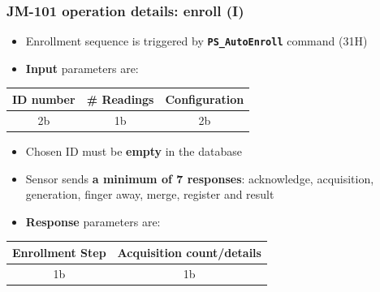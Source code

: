 \documentclass[handout]{beamer}
\begin{document}
\begin{frame}
  \frametitle{JM-101 operation details: enroll (I)}

  \begin{itemize}
    \item Enrollment sequence is triggered by
          \textbf{\texttt{PS\_AutoEnroll}} command (31H)
    \item \textbf{Input} parameters are:
  \end{itemize}

  \begin{table}
    \centering
    \footnotesize
    \begin{tabular}{ccc}
      \toprule
      ID number & \# Readings & Configuration \\
      \midrule
      2b        & 1b          & 2b            \\
      \bottomrule
    \end{tabular}
  \end{table}

  \begin{itemize}
    \item Chosen ID must be \textbf{empty} in the database
    \item Sensor sends \textbf{a minimum of 7 responses}: acknowledge,
          acquisition, generation, finger away, merge, register and result
    \item \textbf{Response} parameters are:
  \end{itemize}

  \begin{table}
    \centering
    \footnotesize
    \begin{tabular}{cc}
      \toprule
      Enrollment Step & Acquisition count/details \\
      \midrule
      1b              & 1b                        \\
      \bottomrule
    \end{tabular}
  \end{table}
\end{frame}
\end{document}
